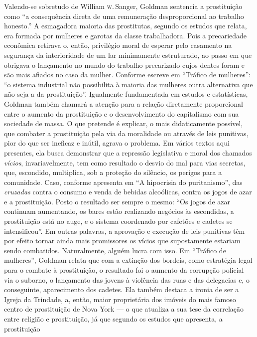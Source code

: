 Valendo-se sobretudo de William \textsc{w}.\,Sanger, Goldman sentencia a
prostituição como ``a consequência direta de uma remuneração
desproporcional ao trabalho honesto.'' A esmagadora maioria das
prostitutas, segundo os estudos que relata, era formada por mulheres e
garotas da classe trabalhadora. Pois a precariedade econômica retirava
o, então, privilégio moral de esperar pelo casamento na segurança da
interioridade de um lar minimamente estruturado, ao passo em que
obrigava o lançamento no mundo do trabalho precarizado cujos dentes
foram e são mais afiados no caso da mulher. Conforme escreve em
``Tráfico de mulheres'': ``o sistema industrial não possibilita à
maioria das mulheres outra alternativa que não seja a da prostituição''.
Igualmente fundamentada em estudos e estatísticas, Goldman também
chamará a atenção para a relação diretamente proporcional entre o
aumento da prostituição e o desenvolvimento do capitalismo com sua
sociedade de massa. O que pretende é explicar, o mais didaticamente
possível, que combater a prostituição pela via da moralidade ou através
de leis punitivas, pior do que ser ineficaz e inútil, agrava o problema.
Em vários textos aqui presentes, ela busca demonstrar que a repressão
legislativa e moral dos chamados \textit{vícios}, invariavelmente, tem como
resultado o desvio do mal para vias secretas, que, escondido,
multiplica, sob a proteção do silêncio, os perigos para a comunidade.
Caso, conforme apresenta em ``A hipocrisia do puritanismo'', das
\textit{cruzadas} contra o consumo e venda de bebidas alcoólicas, contra os
jogos de azar e a prostituição. Posto o resultado ser sempre o mesmo:
``Os jogos de azar continuam aumentando, os bares estão realizando
negócios às escondidas, a prostituição está no auge, e o sistema
coordenado por cafetões e cadetes se intensificou''. Em outras palavras,
a aprovação e execução de leis punitivas têm por efeito tornar ainda
mais promissores os vícios que supostamente estariam sendo combatidos.
Naturalmente, alguém lucra com isso. Em ``Tráfico de mulheres'', Goldman
relata que com a extinção dos bordeis, como estratégia legal para o
combate à prostituição, o resultado foi o aumento da corrupção policial
via o suborno, o lançamento das jovens à violência das ruas e das
delegacias e, o conseguinte, aparecimento dos cadetes. Ela também
destaca a ironia de ser a Igreja da Trindade, a, então, maior
proprietária dos imóveis do mais famoso centro de prostituição de Nova
York --- o que atualiza a sua tese da correlação entre religião e
prostituição, já que segundo os estudos que apresenta, a prostituição
